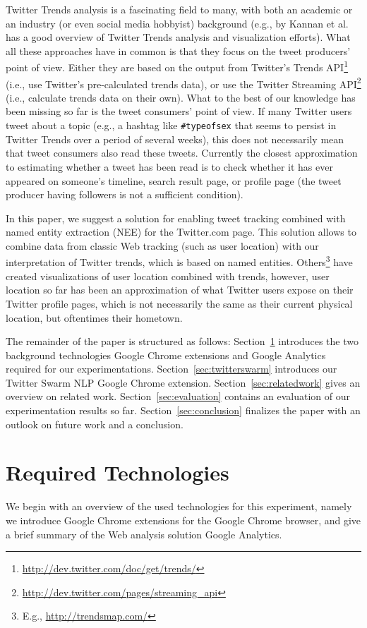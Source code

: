 \documentclass[runningheads,a4paper]{llncs}
\begin{document}
Twitter Trends analysis is a fascinating field to many, with both an academic or an industry (or even social media hobbyist) background (e.g., \cite{Kannan:Trendtracker} by Kannan et al. has a good overview of Twitter Trends analysis and visualization efforts). What all these approaches have in common is that they focus on the tweet producers' point of view. Either they are based on the output from Twitter's Trends API\footnote{\url{http://dev.twitter.com/doc/get/trends/}} (i.e., use Twitter's pre-calculated trends data), or use the Twitter Streaming API\footnote{\url{http://dev.twitter.com/pages/streaming_api}} (i.e., calculate trends data on their own). What to the best of our knowledge has been missing so far is the tweet consumers' point of view. If many Twitter users tweet about a topic (e.g., a hashtag like \texttt{\#typeofsex} that seems to persist in Twitter Trends over a period of several weeks), this does not necessarily mean that tweet consumers also read these tweets. Currently the closest approximation to estimating whether a tweet has been read is to check whether it has ever appeared on someone's timeline, search result page, or profile page (the tweet producer having followers is not a sufficient condition).

In this paper, we suggest a solution for enabling tweet tracking combined with named entity extraction (NEE) for the Twitter.com page. This solution allows to combine data from classic Web tracking (such as user location) with our interpretation of Twitter trends, which is based on named entities. Others\footnote{E.g., \url{http://trendsmap.com/}} have created visualizations of user location combined with trends, however, user location so far has been an approximation of what Twitter users expose on their Twitter profile pages, which is not necessarily the same as their current physical location, but oftentimes their hometown. 

The remainder of the paper is structured as follows: Section~\ref{sec:reqtec} introduces the two background technologies Google Chrome extensions and Google Analytics required for our experimentations. Section~\ref{sec:twitterswarm} introduces our Twitter Swarm NLP Google Chrome extension. Section~\ref{sec:relatedwork} gives an overview on related work. Section~\ref{sec:evaluation} contains an evaluation of our experimentation results so far. Section~\ref{sec:conclusion} finalizes the paper with an outlook on future work and a conclusion.

\section{Required Technologies}\label{sec:reqtec}
We begin with an overview of the used technologies for this experiment, namely we introduce Google Chrome extensions for the Google Chrome browser, and give a brief summary of the Web analysis solution Google Analytics.
\end{document}

